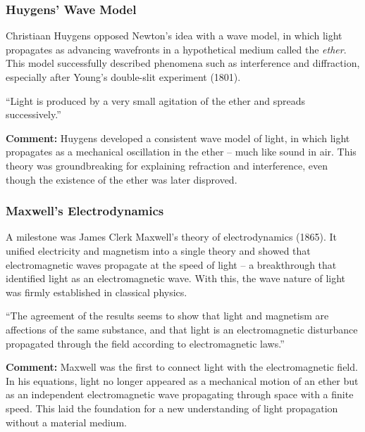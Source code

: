 \subsubsection{Huygens’ Wave Model}
Christiaan Huygens opposed Newton’s idea with a wave model, in which light propagates as advancing wavefronts in a hypothetical medium called the \emph{ether}. This model successfully described phenomena such as interference and diffraction, especially after Young’s double-slit experiment (1801).

\vspace{1em}
\begin{tcolorbox}[physikbox, title={Huygens (1960) on the Propagation of Light \cite{huygens_light}}]
	\label{box:huygens}
	“Light is produced by a very small agitation of the ether and spreads successively.”\\
	
	\vspace{1em}
	
	\textbf{Comment:} Huygens developed a consistent wave model of light, in which light propagates as a mechanical oscillation in the ether – much like sound in air. This theory was groundbreaking for explaining refraction and interference, even though the existence of the ether was later disproved.
\end{tcolorbox}
\vspace{1em}
\newpage
\noindent
\subsubsection{Maxwell’s Electrodynamics}
A milestone was James Clerk Maxwell’s theory of electrodynamics (1865). It unified electricity and magnetism into a single theory and showed that electromagnetic waves propagate at the speed of light – a breakthrough that identified light as an electromagnetic wave. With this, the wave nature of light was firmly established in classical physics.

\begin{tcolorbox}[physikbox,title={Maxwell (1873) on Light and Electromagnetic Waves \cite{maxwell_treatise}}]
	\label{box:maxwell}
	“The agreement of the results seems to show that light and magnetism are affections of the same substance, and that light is an electromagnetic disturbance propagated through the field according to electromagnetic laws.”\\
	
	\vspace{1em}
	
	\textbf{Comment:} Maxwell was the first to connect light with the electromagnetic field. In his equations, light no longer appeared as a mechanical motion of an ether but as an independent electromagnetic wave propagating through space with a finite speed. This laid the foundation for a new understanding of light propagation without a material medium.
\end{tcolorbox}

